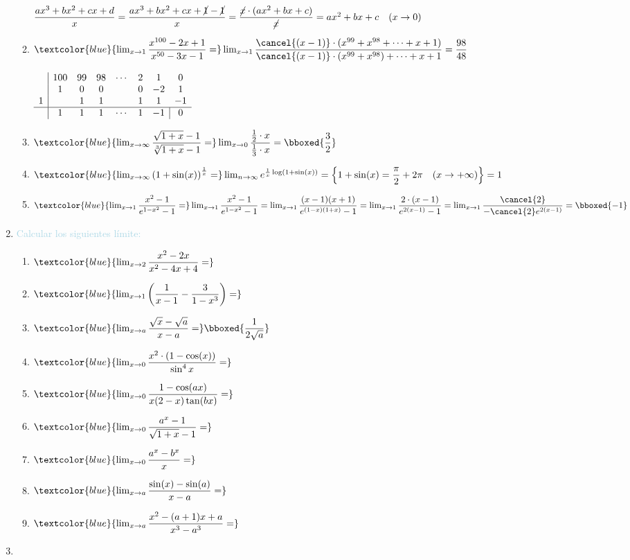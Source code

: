 \begin{enumerate}[label=\color{red}\textbf{\arabic*)}, leftmargin=*]
\begin{enumerate}[label=\color{red}\alph*)]
		$\dfrac{ax^3+bx^2+cx+d}{x}=\dfrac{ax^3+bx^2+cx+\cancel{1}-\cancel{1}}{x}=\dfrac{\cancel{x}\cdot(ax^2+bx+c)}{\cancel{x}}=ax^2+bx+c\quad (x\to0)$
		\item $\textcolor{blue}{\lim_{x\to1}\dfrac{x^{100}-2x+1}{x^{50}-3x-1}=}\lim_{x\to1}\dfrac{\cancel{(x-1)}\cdot(x^{99}+x^{98}+\cdots+x+1)}{\cancel{(x-1)}\cdot(x^{99}+x^{98})+\cdots+x+1}=\dfrac{98}{48}$
		
		$\begin{array}{c|ccccccc}
			& 100 & 99 & 98 & \cdots & 2 & 1 & 0 \\
			& 1 & 0 & 0 &  & 0 & -2 & 1 \\
			1 &  & 1 & 1 &  & 1 & 1 & -1 \\ \hline
			& 1 & 1 & 1 & \cdots & 1 & -1 & \multicolumn{1}{|c}{0}\\
		\end{array}$
		\item $\textcolor{blue}{\lim_{x\to\infty}\dfrac{\sqrt{1+x}-1}{\sqrt[3]{1+x}-1}=}\lim_{x\to0}\dfrac{\frac{1}{2}\cdot x}{\frac{1}{3}\cdot x}=\bboxed{\dfrac{3}{2}}$
		\item $\textcolor{blue}{\lim_{x\to\infty}\left(1+\sin(x)\right)^{\frac{1}{x}}=}\lim_{n\to\infty}{\Huge e}^{\frac{1}{x}\log(1+\sin(x))}=\left\{1+\sin(x)=\dfrac{\pi}{2}+2\pi\quad(x\to+\infty)\right\}=1$
		\item $\textcolor{blue}{\lim_{x\to1}\dfrac{x^2-1}{e^{1-x^2}-1}=}\lim_{x\to1}\dfrac{x^2-1}{e^{1-x^2}-1}=\lim_{x\to1}\dfrac{(x-1)(x+1)}{e^{(1-x)(1+x)}-1}=\lim_{x\to1}\dfrac{2\cdot(x-1)}{e^{2(x-1)}-1}=\lim_{x\to1}\dfrac{\cancel{2}}{-\cancel{2}e^{2(x-1)}}=\bboxed{-1}$
	\end{enumerate}
	\item \textcolor{lightblue}{Calcular los siguientes límite:}
	\begin{enumerate}[label=\color{red}\alph*)]
		\item $\textcolor{blue}{\lim_{x\to2}\dfrac{x^2-2x}{x^2-4x+4}=}$
		\item $\textcolor{blue}{\lim_{x\to1}\left(\dfrac{1}{x-1}-\dfrac{3}{1-x^3}\right)=}$
		\item $\textcolor{blue}{\lim_{x\to a}\dfrac{\sqrt{x}-\sqrt{a}}{x-a}=}\bboxed{\dfrac{1}{2\sqrt{a}}}$
		\item $\textcolor{blue}{\lim_{x\to0}\dfrac{x^2\cdot(1-\cos(x))}{\sin^4x}=}$
		\item $\textcolor{blue}{\lim_{x\to0}\dfrac{1-\cos(ax)}{x(2-x)\tan(bx)}=}$
		\item $\textcolor{blue}{\lim_{x\to0}\dfrac{a^x-1}{\sqrt{1+x}-1}=}$
		\item $\textcolor{blue}{\lim_{x\to0}\dfrac{a^x-b^x}{x}=}$
		\item $\textcolor{blue}{\lim_{x\to a}\dfrac{\sin(x)-\sin(a)}{x-a}=}$
		\item $\textcolor{blue}{\lim_{x\to a}\dfrac{x^2-(a+1)x+a}{x^3-a^3}=}$
	\end{enumerate}
	\item {}
	

\end{enumerate}
